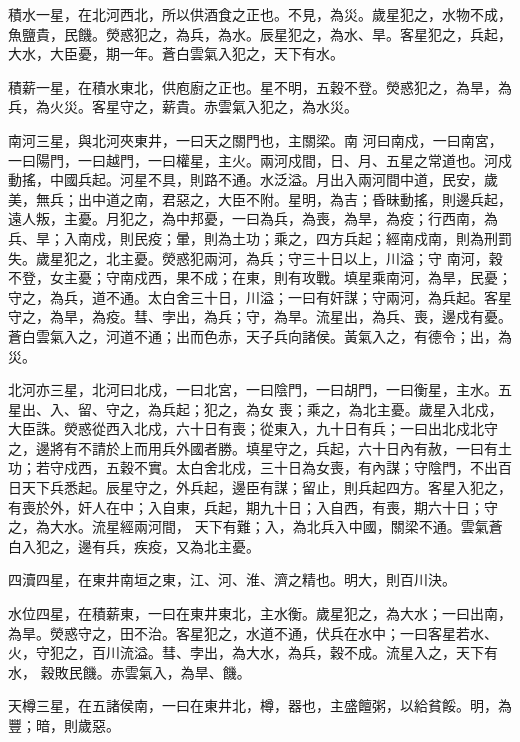 \begin{pinyinscope}
 積水一星，在北河西北，所以供酒食之正也。不見，為災。歲星犯之，水物不成，魚鹽貴，民饑。熒惑犯之，為兵，為水。辰星犯之，為水、旱。客星犯之，兵起，大水，大臣憂，期一年。蒼白雲氣入犯之，天下有水。



 積薪一星，在積水東北，供庖廚之正也。星不明，五穀不登。熒惑犯之，為旱，為兵，為火災。客星守之，薪貴。赤雲氣入犯之，為水災。



 南河三星，與北河夾東井，一曰天之關門也，主關梁。南
 河曰南戍，一曰南宮，一曰陽門，一曰越門，一曰權星，主火。兩河戍間，日、月、五星之常道也。河戍動搖，中國兵起。河星不具，則路不通。水泛溢。月出入兩河間中道，民安，歲美，無兵；出中道之南，君惡之，大臣不附。星明，為吉；昏昧動搖，則邊兵起，遠人叛，主憂。月犯之，為中邦憂，一曰為兵，為喪，為旱，為疫；行西南，為兵、旱；入南戍，則民疫；暈，則為土功；乘之，四方兵起；經南戍南，則為刑罰失。歲星犯之，北主憂。熒惑犯兩河，為兵；守三十日以上，川溢；守
 南河，穀不登，女主憂；守南戍西，果不成；在東，則有攻戰。填星乘南河，為旱，民憂；守之，為兵，道不通。太白舍三十日，川溢；一曰有奸謀；守兩河，為兵起。客星守之，為旱，為疫。彗、孛出，為兵；守，為旱。流星出，為兵、喪，邊戍有憂。蒼白雲氣入之，河道不通；出而色赤，天子兵向諸侯。黃氣入之，有德令；出，為災。



 北河亦三星，北河曰北戍，一曰北宮，一曰陰門，一曰胡門，一曰衡星，主水。五星出、入、留、守之，為兵起；犯之，為女
 喪；乘之，為北主憂。歲星入北戍，大臣誅。熒惑從西入北戍，六十日有喪；從東入，九十日有兵；一曰出北戍北守之，邊將有不請於上而用兵外國者勝。填星守之，兵起，六十日內有赦，一曰有土功；若守戍西，五穀不實。太白舍北戍，三十日為女喪，有內謀；守陰門，不出百日天下兵悉起。辰星守之，外兵起，邊臣有謀；留止，則兵起四方。客星入犯之，有喪於外，奸人在中；入自東，兵起，期九十日；入自西，有喪，期六十日；守之，為大水。流星經兩河間，
 天下有難；入，為北兵入中國，關梁不通。雲氣蒼白入犯之，邊有兵，疾疫，又為北主憂。



 四瀆四星，在東井南垣之東，江、河、淮、濟之精也。明大，則百川決。



 水位四星，在積薪東，一曰在東井東北，主水衡。歲星犯之，為大水；一曰出南，為旱。熒惑守之，田不治。客星犯之，水道不通，伏兵在水中；一曰客星若水、火，守犯之，百川流溢。彗、孛出，為大水，為兵，穀不成。流星入之，天下有水，
 穀敗民饑。赤雲氣入，為旱、饑。



 天樽三星，在五諸侯南，一曰在東井北，樽，器也，主盛饘粥，以給貧餒。明，為豐；暗，則歲惡。




\end{pinyinscope}
